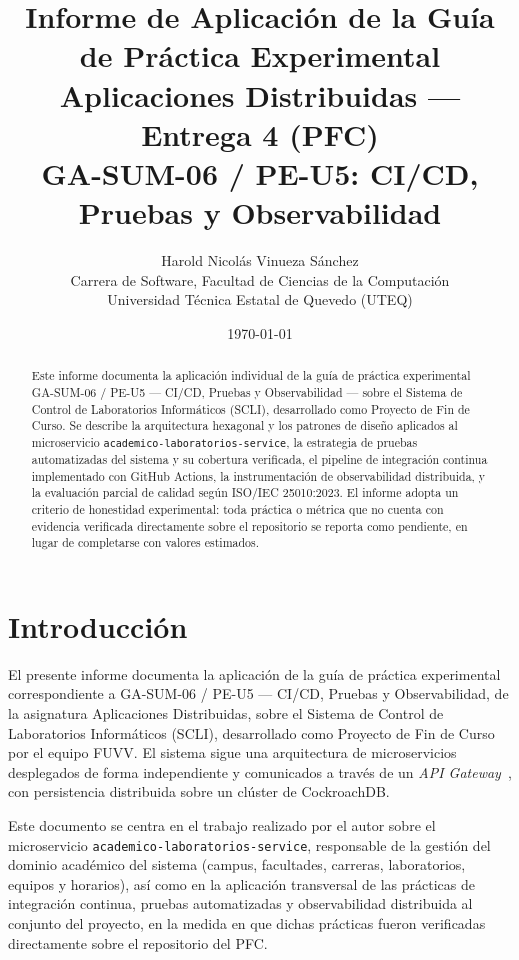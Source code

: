 \documentclass[11pt,a4paper]{article}
\title{Informe de Aplicación de la Guía de Práctica Experimental\\
Aplicaciones Distribuidas --- Entrega 4 (PFC)\\
\large GA-SUM-06 / PE-U5: CI/CD, Pruebas y Observabilidad}
\author{Harold Nicolás Vinueza Sánchez\\
Carrera de Software, Facultad de Ciencias de la Computación\\
Universidad Técnica Estatal de Quevedo (UTEQ)}
\date{\today}
\begin{document}
\maketitle

\begin{abstract}
Este informe documenta la aplicación individual de la guía de práctica
experimental GA-SUM-06 / PE-U5 --- CI/CD, Pruebas y Observabilidad ---
sobre el Sistema de Control de Laboratorios Informáticos (SCLI),
desarrollado como Proyecto de Fin de Curso. Se describe la arquitectura
hexagonal y los patrones de diseño aplicados al microservicio
\texttt{academico-laboratorios-service}, la estrategia de pruebas
automatizadas del sistema y su cobertura verificada, el pipeline de
integración continua implementado con GitHub Actions, la
instrumentación de observabilidad distribuida, y la evaluación parcial
de calidad según ISO/IEC 25010:2023. El informe adopta un criterio de
honestidad experimental: toda práctica o métrica que no cuenta con
evidencia verificada directamente sobre el repositorio se reporta como
pendiente, en lugar de completarse con valores estimados.
\end{abstract}

\tableofcontents
\newpage

\section{Introducción}
\label{sec:intro}

El presente informe documenta la aplicación de la guía de práctica
experimental correspondiente a GA-SUM-06 / PE-U5 --- CI/CD, Pruebas y
Observabilidad, de la asignatura Aplicaciones Distribuidas, sobre el
Sistema de Control de Laboratorios Informáticos (SCLI), desarrollado
como Proyecto de Fin de Curso por el equipo FUVV. El sistema sigue una
arquitectura de microservicios desplegados de forma independiente y
comunicados a través de un \emph{API Gateway}~\cite{newman2021building},
con persistencia distribuida sobre un clúster de CockroachDB.

Este documento se centra en el trabajo realizado por el autor sobre el
microservicio \texttt{academico-laboratorios-service}, responsable de
la gestión del dominio académico del sistema (campus, facultades,
carreras, laboratorios, equipos y horarios), así como en la aplicación
transversal de las prácticas de integración continua, pruebas
automatizadas y observabilidad distribuida al conjunto del proyecto,
en la medida en que dichas prácticas fueron verificadas directamente
sobre el repositorio del PFC.
\end{document}
